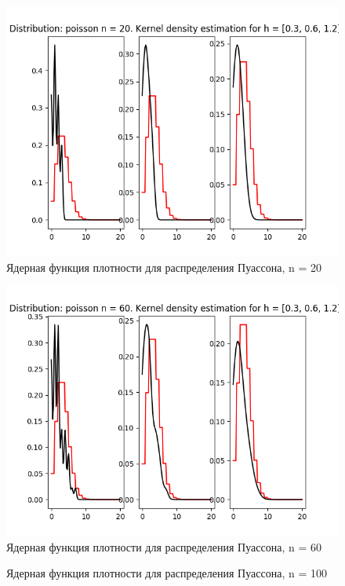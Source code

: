 \documentclass[12pt]{article}
\begin{document}
\begin{center}
    \begin{figure}[H]
 \caption{Ядерная функция плотности для распределения Пуассона, n = 20}
\includegraphics[width=\textwidth]{kernel/d_poisson20.png}
\end{figure}
    \begin{figure}[H]
 \caption{Ядерная функция плотности для распределения Пуассона, n = 60}
\includegraphics[width=\textwidth]{kernel/d_poisson60.png}
\end{figure}
    \begin{figure}[H]
 \caption{Ядерная функция плотности для распределения Пуассона, n = 100}

\end{figure}
\end{center}
\end{document}
